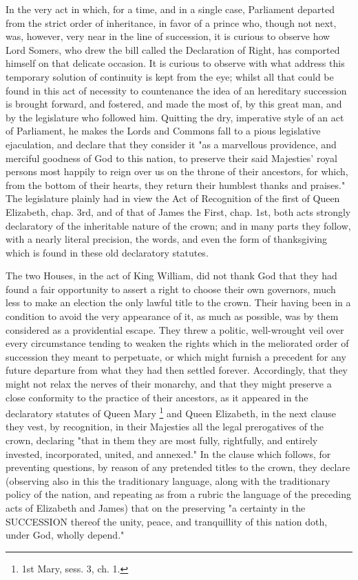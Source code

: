 In the very act in which, for a time, and in a single case, Parliament departed from the strict order of inheritance, in favor of a prince who, though not next, was, however, very near in the line of succession, it is curious to observe how Lord Somers, who drew the bill called the Declaration of Right, has comported himself on that delicate occasion. It is curious to observe with what address this temporary solution of continuity is kept from the eye; whilst all that could be found in this act of necessity to countenance the idea of an hereditary succession is brought forward, and fostered, and made the most of, by this great man, and by the legislature who followed him. Quitting the dry, imperative style of an act of Parliament, he makes the Lords and Commons fall to a pious legislative ejaculation, and declare that they consider it "as a marvellous providence, and merciful goodness of God to this nation, to preserve their said Majesties' royal persons most happily to reign over us on the throne of their ancestors, for which, from the bottom of their hearts, they return their humblest thanks and praises." The legislature plainly had in view the Act of Recognition of the first of Queen Elizabeth, chap. 3rd, and of that of James the First, chap. 1st, both acts strongly declaratory of the inheritable nature of the crown; and in many parts they follow, with a nearly literal precision, the words, and even the form of thanksgiving which is found in these old declaratory statutes.

The two Houses, in the act of King William, did not thank God that they had found a fair opportunity to assert a right to choose their own governors, much less to make an election the only lawful title to the crown. Their having been in a condition to avoid the very appearance of it, as much as possible, was by them considered as a providential escape. They threw a politic, well-wrought veil over every circumstance tending to weaken the rights which in the meliorated order of succession they meant to perpetuate, or which might furnish a precedent for any future departure from what they had then settled forever. Accordingly, that they might not relax the nerves of their monarchy, and that they might preserve a close conformity to the practice of their ancestors, as it appeared in the declaratory statutes of Queen Mary
\footnote{ 1st Mary, sess. 3, ch. 1.}
 and Queen Elizabeth, in the next clause they vest, by recognition, in their Majesties all the legal prerogatives of the crown, declaring "that in them they are most fully, rightfully, and entirely invested, incorporated, united, and annexed." In the clause which follows, for preventing questions, by reason of any pretended titles to the crown, they declare (observing also in this the traditionary language, along with the traditionary policy of the nation, and repeating as from a rubric the language of the preceding acts of Elizabeth and James) that on the preserving "a certainty in the SUCCESSION thereof the unity, peace, and tranquillity of this nation doth, under God, wholly depend."

